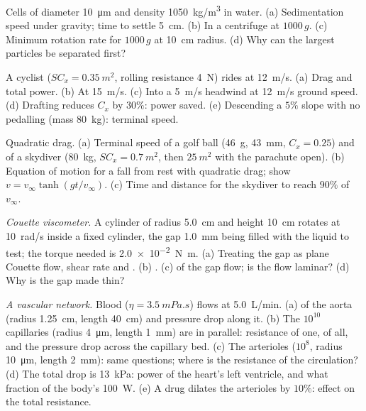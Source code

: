 \begin{exercise}[$\star\star$]\label{exo:b2:viscous-flows:6}
Cells of diameter \qty{10}{\micro m} and density \qty{1050}{kg/m^3} in water.
(a) Sedimentation speed under gravity; time to settle \qty{5}{cm}. (b) In
a centrifuge at $1000\,g$. (c) Minimum rotation rate for $1000\,g$ at
\qty{10}{cm} radius. (d) Why can the largest particles be separated first?
\end{exercise}

\begin{exercise}[$\star\star$]\label{exo:b2:viscous-flows:7}
A cyclist ($SC_x = \qty{0.35}{m^2}$, rolling resistance \qty{4}{N}) rides at
\qty{12}{m/s}. (a) Drag and total power. (b) At \qty{15}{m/s}. (c) Into a
\qty{5}{m/s} headwind at \qty{12}{m/s} ground speed. (d) Drafting reduces
$C_x$ by $30\%$: power saved. (e) Descending a $5\%$ slope with no pedalling
(mass \qty{80}{kg}): terminal speed.
\end{exercise}

\begin{exercise}[$\star\star$]\label{exo:b2:viscous-flows:8}
Quadratic drag. (a) Terminal speed of a golf ball (\qty{46}{g}, \qty{43}{mm},
$C_x = 0.25$) and of a skydiver (\qty{80}{kg}, $SC_x = \qty{0.7}{m^2}$, then
$\qty{25}{m^2}$ with the parachute open). (b) Equation of motion for a fall
from rest with quadratic drag; show $v = v_\infty\tanh(gt/v_\infty)$. (c)
Time and distance for the skydiver to reach $90\%$ of $v_\infty$.
\end{exercise}

\begin{exercise}[$\star\star$]\label{exo:b2:viscous-flows:9}
\emph{Couette viscometer.} A cylinder of radius \qty{5.0}{cm} and height
\qty{10}{cm} rotates at \qty{10}{rad/s} inside a fixed cylinder, the gap
\qty{1.0}{mm} being filled with the liquid to test; the torque needed is
\qty{2.0e-2}{N.m}. (a) Treating the gap as plane Couette flow, shear rate
and . (b) . (c)  of the gap flow;
is the flow laminar? (d) Why is the gap made thin?
\end{exercise}

\begin{exercise}[$\star\star\star$]\label{exo:b2:viscous-flows:10}
\emph{A vascular network.} Blood ($\eta = \qty{3.5}{mPa.s}$) flows at
\qty{5.0}{L/min}. (a)  of the aorta (radius \qty{1.25}{cm},
length \qty{40}{cm}) and pressure drop along it. (b) The $10^{10}$
capillaries (radius \qty{4}{\micro m}, length \qty{1}{mm}) are in parallel:
resistance of one, of all, and the pressure drop across the capillary
bed. (c) The arterioles ($10^8$, radius \qty{10}{\micro m}, length
\qty{2}{mm}): same questions; where is the resistance of the circulation?
(d) The total drop is \qty{13}{kPa}: power of the heart's left ventricle,
and what fraction of the body's \qty{100}{W}. (e) A drug dilates the
arterioles by $10\%$: effect on the total resistance.
\end{exercise}

